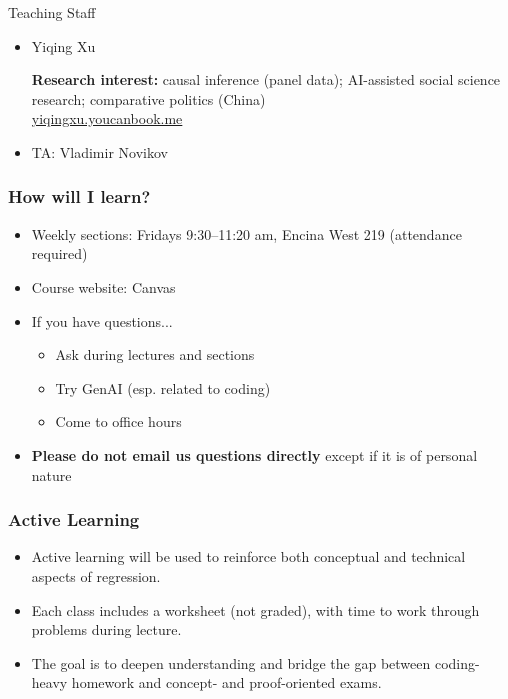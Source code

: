 \documentclass[xcolor=svgnames,9pt,english,aspectratio=169,t]{beamer}
\newif\ifrelease
\begin{document}

\begin{frame}{Teaching Staff}
  \begin{itemize}
    \itemsep20pt\parskip0pt
  \item
    Yiqing Xu\medskip

    {\bf Research interest:} causal inference (panel data); AI-assisted social science research; comparative politics (China)
\ifrelease\else\\
    \textcolor{NavyBlue}{\url{yiqingxu.youcanbook.me}}    
  \item TA: Vladimir Novikov
\fi
  \end{itemize}
\end{frame}




\begin{frame}
\frametitle{How will I learn?}
\small
\begin{itemize}
\ifrelease
\item Weekly sections led by the TA (attendance required)
\else
\item Weekly sections: Fridays 9:30--11:20 am, Encina West 219 (attendance required)
\item Course website: Canvas
\fi
\item If you have questions...
\smallskip
	\begin{itemize}\itemsep0.5em
	\item Ask during lectures and sections
  \item Try GenAI (esp. related to coding)
	\item Come to office hours
	\end{itemize}
	\item {\bf Please do not email us questions directly} except if it is of personal nature 	
\end{itemize}
\end{frame}

\begin{frame}
\frametitle{Active Learning}
\begin{itemize}\itemsep1em
\item Active learning will be used to reinforce both conceptual and technical aspects of regression.
\item Each class includes a worksheet (not graded), with time to work through problems during lecture.
\item The goal is to deepen understanding and bridge the gap between coding-heavy homework and concept- and proof-oriented exams.
\end{itemize}
\end{frame}
\end{document}
